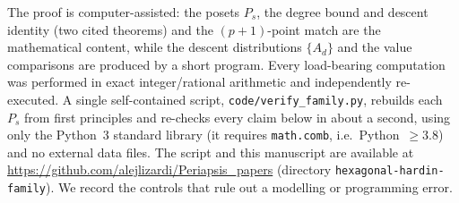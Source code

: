 \documentclass[11pt]{article}
\theoremstyle{plain}
\theoremstyle{definition}
\theoremstyle{remark}
\begin{document}
The proof is computer-assisted: the posets $P_s$, the degree bound and descent identity (two cited
theorems) and the $(p{+}1)$-point match are the mathematical content, while the descent distributions
$\{A_d\}$ and the value comparisons are produced by a short program. Every load-bearing computation
was performed in exact integer/rational arithmetic and independently re-executed. A single
self-contained script, \texttt{code/verify\_family.py}, rebuilds each $P_s$ from first principles and
re-checks every claim below in about a second, using only the Python~3 standard library (it requires
\texttt{math.comb}, i.e.\ Python~$\ge 3.8$) and no external data files. The script and this manuscript
are available at \url{https://github.com/alejlizardi/Periapsis_papers} (directory
\texttt{hexagonal-hardin-family}). We record the controls that rule out a modelling or programming
error.
\end{document}
